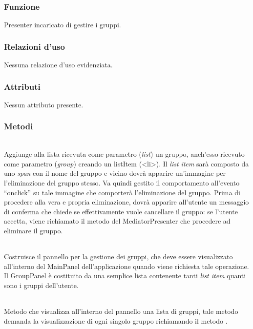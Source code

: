 
\subsubsection*{Funzione}
Presenter incaricato di gestire i gruppi.

\subsubsection*{Relazioni d'uso}
Nessuna relazione d'uso evidenziata.

\subsubsection*{Attributi}
\begin{description}
\item Nessun attributo presente.
\end{description}

\subsubsection*{Metodi}
\begin{description}
\item{}\\
Aggiunge alla lista ricevuta come parametro (\textit{list}) un gruppo, anch'esso ricevuto come parametro (\textit{group}) creando un listItem (<li>). Il \textit{list item} sarà composto da uno \textit{span} con il nome del gruppo e vicino dovrà apparire un'immagine per l'eliminazione del gruppo stesso. Va quindi gestito il comportamento all'evento ``onclick'' su tale immagine che comporterà l'eliminazione del gruppo. Prima di procedere alla vera e propria eliminazione, dovrà apparire all'utente un messaggio di conferma che chiede se effettivamente vuole cancellare il gruppo: se l'utente accetta, viene richiamato il metodo del MediatorPresenter  che procedere ad eliminare il gruppo.

\item{}\\
Costruisce il pannello per la gestione dei gruppi, che deve essere visualizzato all'interno del MainPanel dell'applicazione quando viene richiesta tale operazione. Il GroupPanel è costituito da una semplice lista contenente tanti \textit{list item} quanti sono i gruppi dell'utente.

\item{}\\
Metodo che visualizza all'interno del pannello una lista di gruppi, tale metodo demanda la visualizzazione di ogni singolo gruppo richiamando il metodo .

\end{description}


